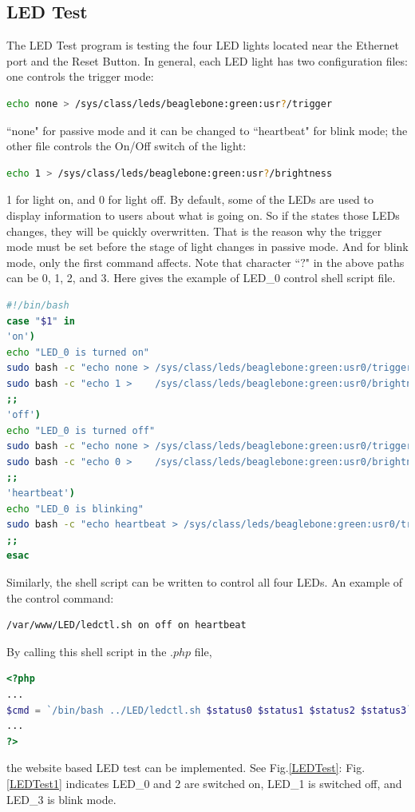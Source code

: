 \documentclass[12pt,journal,draftclsnofoot,onecolumn]{IEEEtran}
\begin{document}
\subsection{LED Test}\label{Led}
The LED Test program is testing the four LED lights located near the Ethernet port and the Reset Button. In general, each LED light has two configuration files: one controls the trigger mode:
\begin{lstlisting}[language={bash}]
echo none > /sys/class/leds/beaglebone:green:usr?/trigger
\end{lstlisting}
``none" for passive mode and it can be changed to ``heartbeat" for blink mode; the other file controls the On/Off switch of the light:
\begin{lstlisting}[language={bash}]
echo 1 > /sys/class/leds/beaglebone:green:usr?/brightness
\end{lstlisting}
1 for light on, and 0 for light off. By default, some of the LEDs are used to display information to users about what is going on. So if the states those LEDs changes, they will be quickly overwritten. That is the reason why the trigger mode must be set before the stage of light changes in passive mode. And for blink mode, only the first command affects. Note that character ``$?$" in the above paths can be 0, 1, 2, and 3. Here gives the example of LED\_0 control shell script file.
\begin{lstlisting}[language={bash}]
#!/bin/bash
case "$1" in
'on')
echo "LED_0 is turned on"
sudo bash -c "echo none > /sys/class/leds/beaglebone:green:usr0/trigger"
sudo bash -c "echo 1 >    /sys/class/leds/beaglebone:green:usr0/brightness"
;;
'off')
echo "LED_0 is turned off"
sudo bash -c "echo none > /sys/class/leds/beaglebone:green:usr0/trigger"
sudo bash -c "echo 0 >    /sys/class/leds/beaglebone:green:usr0/brightness"
;;
'heartbeat')
echo "LED_0 is blinking"
sudo bash -c "echo heartbeat > /sys/class/leds/beaglebone:green:usr0/trigger"
;;
esac
\end{lstlisting}
Similarly, the shell script can be written to control all four LEDs. An example of the control command:
\begin{lstlisting}[language={bash}]
/var/www/LED/ledctl.sh on off on heartbeat 
\end{lstlisting}
By calling this shell script in the $.php$ file,
\begin{lstlisting}[language={PHP}]
<?php
...
$cmd = `/bin/bash ../LED/ledctl.sh $status0 $status1 $status2 $status3`;
...
?>
\end{lstlisting}
the website based LED test can be implemented. See Fig.\ref{LEDTest}: Fig.\ref{LEDTest1} indicates LED\_0 and 2 are switched on, LED\_1 is switched off, and LED\_3 is blink mode.
\end{document}
